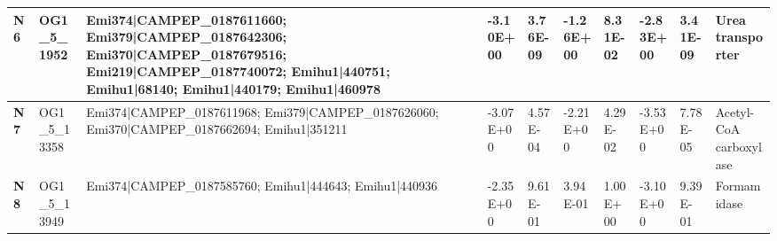 \begin{landscape}
\begin{center}
\begin{footnotesize}
\begin{longtable}{|p{0.5cm}|p{1.5cm}|p{4cm}|l|l|l|l|l|l|l|}
\textbf{N6}  & OG1\_5\_1952  & Emi374|CAMPEP\_0187611660; Emi379|CAMPEP\_0187642306; Emi370|CAMPEP\_0187679516; Emi219|CAMPEP\_0187740072; Emihu1|440751; Emihu1|68140; Emihu1|440179; Emihu1|460978                                                                                                                                                                                                                                                                                                                                                                                                                                                                    & -3.10E+00 & 3.76E-09 & -1.26E+00 & 8.31E-02 & -2.83E+00 & 3.41E-09 & Urea transporter                                                             \\ \hline
\textbf{N7}  & OG1\_5\_13358 & Emi374|CAMPEP\_0187611968; Emi379|CAMPEP\_0187626060; Emi370|CAMPEP\_0187662694; Emihu1|351211                                                                                                                                                                                                                                                                                                                                                                                                                                                                                                                                           & -3.07E+00 & 4.57E-04 & -2.21E+00 & 4.29E-02 & -3.53E+00 & 7.78E-05 & Acetyl-CoA carboxylase                                                       \\ \hline
\textbf{N8}  & OG1\_5\_13949 & Emi374|CAMPEP\_0187585760; Emihu1|444643; Emihu1|440936                                                                                                                                                                                                                                                                                                                                                                                                                                                                                                                                                                                  & -2.35E+00 & 9.61E-01 & 3.94E-01  & 1.00E+00 & -3.10E+00 & 9.39E-01 & Formamidase                                                                  \\ \hline

\end{longtable}
\end{footnotesize}
\end{center}
\end{landscape}
